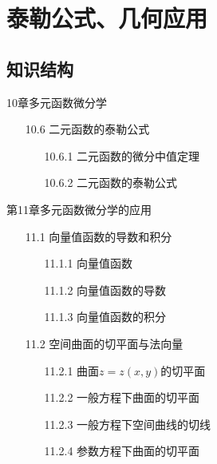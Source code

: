 \documentclass[12pt,UTF8]{ctexart}
\begin{document}
\setcounter{section}{15}
\section{泰勒公式、几何应用}
\noindent
\subsection{知识结构}
10章多元函数微分学
	\begin{enumerate}
		\item[10.6]二元函数的泰勒公式
		\begin{enumerate}
			\item[10.6.1]二元函数的微分中值定理
			\item[10.6.2]二元函数的泰勒公式
		\end{enumerate}
	\end{enumerate}
第11章多元函数微分学的应用
	\begin{enumerate}
		\item[11.1]向量值函数的导数和积分
		\begin{enumerate}
			\item[11.1.1]向量值函数
			\item[11.1.2]向量值函数的导数
			\item[11.1.3]向量值函数的积分
		\end{enumerate}
		\item[11.2]空间曲面的切平面与法向量
		\begin{enumerate}
			\item[11.2.1]曲面$z=z(x,y)$的切平面
			\item[11.2.2]一般方程下曲面的切平面
			\item[11.2.3]一般方程下空间曲线的切线
			\item[11.2.4]参数方程下曲面的切平面
		\end{enumerate}
	\end{enumerate}
\end{document}
